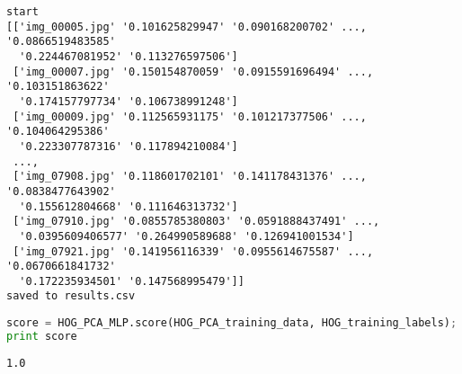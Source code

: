 \begin{lstlisting}
start
[['img_00005.jpg' '0.101625829947' '0.090168200702' ..., '0.0866519483585'
  '0.224467081952' '0.113276597506']
 ['img_00007.jpg' '0.150154870059' '0.0915591696494' ..., '0.103151863622'
  '0.174157797734' '0.106738991248']
 ['img_00009.jpg' '0.112565931175' '0.101217377506' ..., '0.104064295386'
  '0.223307787316' '0.117894210084']
 ..., 
 ['img_07908.jpg' '0.118601702101' '0.141178431376' ..., '0.0838477643902'
  '0.155612804668' '0.111646313732']
 ['img_07910.jpg' '0.0855785380803' '0.0591888437491' ...,
  '0.0395609406577' '0.264990589688' '0.126941001534']
 ['img_07921.jpg' '0.141956116339' '0.0955614675587' ..., '0.0670661841732'
  '0.172235934501' '0.147568995479']]
saved to results.csv
\end{lstlisting}

\begin{lstlisting}[language=Python]
score = HOG_PCA_MLP.score(HOG_PCA_training_data, HOG_training_labels);
print score
\end{lstlisting}

\begin{lstlisting}
1.0
\end{lstlisting}

\begin{lstlisting}[language=Python]
\end{lstlisting}

